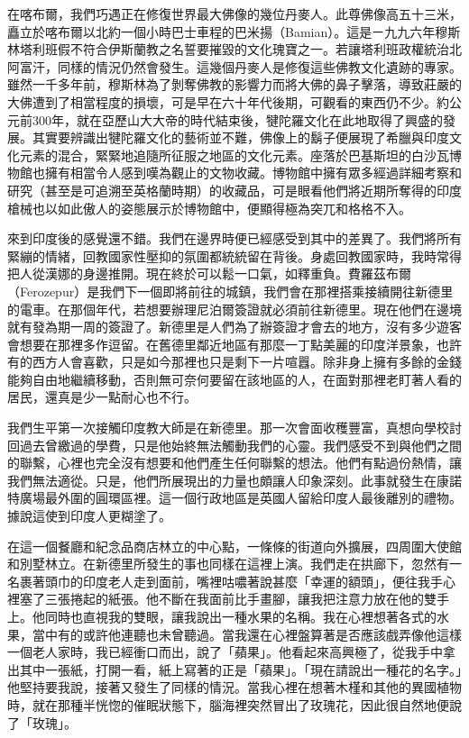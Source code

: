 在喀布爾，我們巧遇正在修復世界最大佛像的幾位丹麥人。此尊佛像高五十三米，矗立於喀布爾以北約一個小時巴士車程的巴米揚（Bamian）。這是ㄧ九九六年穆斯林塔利班假不符合伊斯蘭教之名誓要摧毀的文化瑰寶之一。若讓塔利班政權統治北阿富汗，同樣的情況仍然會發生。這幾個丹麥人是修復這些佛教文化遺跡的專家。雖然一千多年前，穆斯林為了剝奪佛教的影響力而將大佛的鼻子擊落，導致莊嚴的大佛遭到了相當程度的損壞，可是早在六十年代後期，可觀看的東西仍不少。約公元前300年，就在亞歷山大大帝的時代結束後，犍陀羅文化在此地取得了興盛的發展。其實要辨識出犍陀羅文化的藝術並不難，佛像上的鬍子便展現了希臘與印度文化元素的混合，緊緊地追隨所征服之地區的文化元素。座落於巴基斯坦的白沙瓦博物館也擁有相當令人感到嘆為觀止的文物收藏。博物館中擁有眾多經過詳細考察和研究（甚至是可追溯至英格蘭時期）的收藏品，可是眼看他們將近期所奪得的印度槍械也以如此傲人的姿態展示於博物館中，便顯得極為突兀和格格不入。

來到印度後的感覺還不錯。我們在邊界時便已經感受到其中的差異了。我們將所有緊繃的情緒，回教國家性壓抑的氛圍都統統留在背後。身處回教國家時，我時常得把人從漢娜的身邊推開。現在終於可以鬆一口氣，如釋重負。費羅茲布爾（Ferozepur）是我們下一個即將前往的城鎮，我們會在那裡搭乘接續開往新德里的電車。在那個年代，若想要辦理尼泊爾簽證就必須前往新德里。現在他們在邊境就有發為期一周的簽證了。新德里是人們為了辦簽證才會去的地方，沒有多少遊客會想要在那裡多作逗留。在舊德里鄰近地區有那麼一丁點美麗的印度洋景象，也許有的西方人會喜歡，只是如今那裡也只是剩下一片喧囂。除非身上擁有多餘的金錢能夠自由地繼續移動，否則無可奈何要留在該地區的人，在面對那裡老盯著人看的居民，還真是少一點耐心也不行。

我們生平第一次接觸印度教大師是在新德里。那一次會面收穫豐富，真想向學校討回過去曾繳過的學費，只是他始終無法觸動我們的心靈。我們感受不到與他們之間的聯繫，心裡也完全沒有想要和他們產生任何聯繫的想法。他們有點過份熱情，讓我們無法適從。只是，他們所展現出的力量也頗讓人印象深刻。此事就發生在康諾特廣場最外圍的圓環區裡。這一個行政地區是英國人留給印度人最後離別的禮物。據說這使到印度人更糊塗了。

在這一個餐廳和紀念品商店林立的中心點，一條條的街道向外擴展，四周圍大使館和別墅林立。在新德里所發生的事也同樣在這裡上演。我們走在拱廊下，忽然有一名裹著頭巾的印度老人走到面前，嘴裡咕噥著說甚麼「幸運的額頭」，便往我手心裡塞了三張捲起的紙張。他不斷在我面前比手畫腳，讓我把注意力放在他的雙手上。他同時也直視我的雙眼，讓我說出一種水果的名稱。我在心裡想著各式的水果，當中有的或許他連聽也未曾聽過。當我還在心裡盤算著是否應該戲弄像他這樣一個老人家時，我已經衝口而出，說了「蘋果」。他看起來高興極了，從我手中拿出其中一張紙，打開一看，紙上寫著的正是「蘋果」。「現在請說出一種花的名字。」他堅持要我說，接著又發生了同樣的情況。當我心裡在想著木槿和其他的異國植物時，就在那種半恍惚的催眠狀態下，腦海裡突然冒出了玫瑰花，因此很自然地便說了「玫瑰」。

